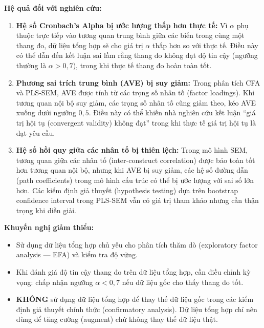 \documentclass[12pt,a4paper]{article}
\begin{document}
\textbf{Hệ quả đối với nghiên cứu:}

\begin{enumerate}
    \item \textbf{Hệ số Cronbach's Alpha bị ước lượng thấp hơn thực tế:}
    Vì $\alpha$ phụ thuộc trực tiếp vào tương quan trung bình giữa các biến 
    trong cùng một thang đo, dữ liệu tổng hợp sẽ cho giá trị $\alpha$ 
    thấp hơn so với thực tế. Điều này có thể dẫn đến kết luận sai lầm rằng 
    thang đo không đạt độ tin cậy (ngưỡng thường là $\alpha > 0{,}7$), 
    trong khi thực tế thang đo hoàn toàn tốt.
    
    \item \textbf{Phương sai trích trung bình (AVE) bị suy giảm:}
    Trong phân tích CFA và PLS-SEM, AVE được tính từ các trọng số nhân tố 
    (factor loadings). Khi tương quan nội bộ suy giảm, 
    các trọng số nhân tố cũng giảm theo, kéo AVE xuống dưới ngưỡng $0{,}5$.
    Điều này có thể khiến nhà nghiên cứu kết luận 
    ``giá trị hội tụ (convergent validity) không đạt'' 
    trong khi thực tế giá trị hội tụ là đạt yêu cầu.
    
    \item \textbf{Hệ số hồi quy giữa các nhân tố bị thiên lệch:}
    Trong mô hình SEM, tương quan giữa các nhân tố 
    (inter-construct correlation) được bảo toàn tốt hơn tương quan nội bộ, 
    nhưng khi AVE bị suy giảm, các hệ số đường dẫn (path coefficients) 
    trong mô hình cấu trúc có thể bị ước lượng với sai số lớn hơn.
    Các kiểm định giả thuyết (hypothesis testing) dựa trên 
    bootstrap confidence interval trong PLS-SEM vẫn có giá trị 
    tham khảo nhưng cần thận trọng khi diễn giải.
\end{enumerate}

\textbf{Khuyến nghị giảm thiểu:}
\begin{itemize}
    \item Sử dụng dữ liệu tổng hợp chủ yếu cho phân tích thăm dò 
    (exploratory factor analysis — EFA) và kiểm tra độ vững.
    \item Khi đánh giá độ tin cậy thang đo trên dữ liệu tổng hợp, 
    cần điều chỉnh kỳ vọng: chấp nhận ngưỡng $\alpha < 0{,}7$ 
    nếu dữ liệu gốc cho thấy thang đo tốt.
    \item \textbf{KHÔNG} sử dụng dữ liệu tổng hợp để thay thế dữ liệu gốc 
    trong các kiểm định giả thuyết chính thức (confirmatory analysis). 
    Dữ liệu tổng hợp chỉ nên dùng để tăng cường (augment) 
    chứ không thay thế dữ liệu thật.
\end{itemize}
\end{document}
